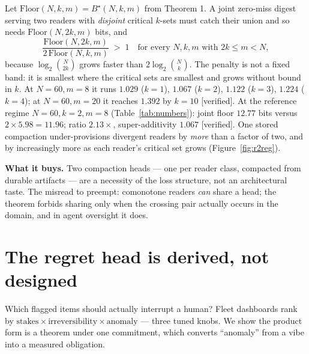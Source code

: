 \documentclass[11pt,a4paper]{article}
\begin{document}
\begin{claim}
Let $\mathrm{Floor}(N,k,m)=B^\star(N,k,m)$ from Theorem 1. A joint zero-miss digest serving two readers with \emph{disjoint} critical $k$-sets must catch their union and so needs $\mathrm{Floor}(N,2k,m)$ bits, and
\[
\frac{\mathrm{Floor}(N,2k,m)}{2\,\mathrm{Floor}(N,k,m)}\;>\;1
\quad\text{for every } N,k,m \text{ with } 2k\le m<N,
\]
because $\log_2\binom{N}{2k}$ grows faster than $2\log_2\binom{N}{k}$. The penalty is not a fixed band: it is smallest where the critical sets are smallest and grows without bound in $k$. At $N{=}60,m{=}8$ it runs $1.029$ ($k{=}1$), $1.067$ ($k{=}2$), $1.122$ ($k{=}3$), $1.224$ ($k{=}4$); at $N{=}60,m{=}20$ it reaches $1.392$ by $k{=}10$ [verified]. At the reference regime $N{=}60,k{=}2,m{=}8$ (Table~\ref{tab:numbers}): joint floor $12.77$ bits versus $2\times 5.98=11.96$; ratio $2.13\times$, super-additivity $1.067$ [verified]. One stored compaction under-provisions divergent readers by \emph{more} than a factor of two, and by increasingly more as each reader's critical set grows (Figure~\ref{fig:r2reg}).
\end{claim}

\textbf{What it buys.} Two compaction heads --- one per reader class, compacted from durable artifacts --- are a necessity of the loss structure, not an architectural taste. The misread to preempt: comonotone readers \emph{can} share a head; the theorem forbids sharing only when the crossing pair actually occurs in the domain, and in agent oversight it does.



\section{The regret head is derived, not designed}\label{sec:regret}
Which flagged items should actually interrupt a human? Fleet dashboards rank by $\mathrm{stakes}\times\mathrm{irreversibility}\times\mathrm{anomaly}$ --- three tuned knobs. We show the product form is a theorem under one commitment, which converts ``anomaly'' from a vibe into a measured obligation.
\end{document}
